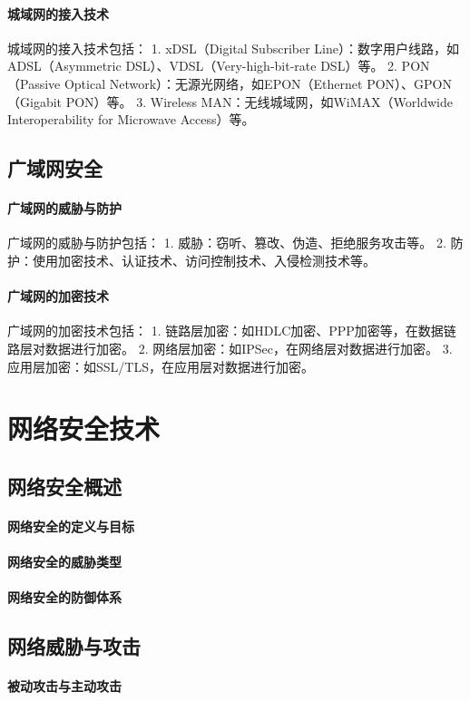 \documentclass{book}
\begin{document}
\subsubsection{城域网的接入技术}
城域网的接入技术包括：
1. xDSL（Digital Subscriber Line）：数字用户线路，如ADSL（Asymmetric DSL）、VDSL（Very-high-bit-rate DSL）等。
2. PON（Passive Optical Network）：无源光网络，如EPON（Ethernet PON）、GPON（Gigabit PON）等。
3. Wireless MAN：无线城域网，如WiMAX（Worldwide Interoperability for Microwave Access）等。
\section{广域网安全}
\subsubsection{广域网的威胁与防护}
广域网的威胁与防护包括：
1. 威胁：窃听、篡改、伪造、拒绝服务攻击等。
2. 防护：使用加密技术、认证技术、访问控制技术、入侵检测技术等。
\subsubsection{广域网的加密技术}
广域网的加密技术包括：
1. 链路层加密：如HDLC加密、PPP加密等，在数据链路层对数据进行加密。
2. 网络层加密：如IPSec，在网络层对数据进行加密。
3. 应用层加密：如SSL/TLS，在应用层对数据进行加密。

\chapter{网络安全技术}
\section{网络安全概述}
\subsubsection{网络安全的定义与目标}
\subsubsection{网络安全的威胁类型}
\subsubsection{网络安全的防御体系}
\section{网络威胁与攻击}
\subsubsection{被动攻击与主动攻击}
\end{document}
